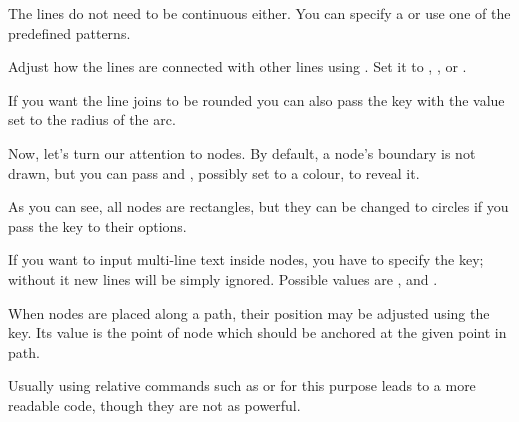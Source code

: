 The lines do not need to be continuous either. You can specify a  or use one of the predefined patterns.
\begin{example}
\end{example}

Adjust how the lines are connected with other lines using
. Set it to , , or
.
\begin{example}
\end{example}
If you want the line joins to be rounded you can also pass the  key with the value set to the radius of the arc.
\begin{example}
\end{example}

Now, let's turn our attention to nodes. By default, a node's boundary is not
drawn, but you can pass  and , possibly set to a
colour, to reveal it.
\begin{example}
\end{example}
As you can see, all nodes are rectangles, but they can be changed to circles if
you pass the  key to their options.
\begin{example}
\end{example}

If you want to input multi-line text inside nodes, you have to specify the
 key; without it new lines will be simply ignored. Possible values
are ,  and .
\begin{example}
\end{example}

When nodes are placed along a path, their position may be adjusted using the
 key. Its value is the point of node which should be anchored at
the given point in path.
\begin{example}
\end{example}
Usually using relative commands such as  or  for
this purpose leads to a more readable code, though they are not as powerful.
\begin{example}
\end{example}

